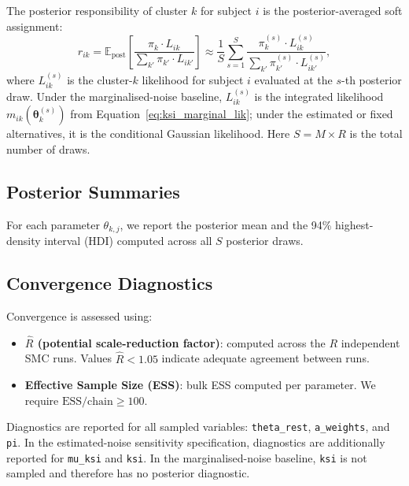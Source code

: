 \documentclass[12pt, a4paper]{article}
\newcommand{\E}{\mathbb{E}}
\newcommand{\btheta}{\bm{\theta}}
\begin{document}
The posterior responsibility of cluster $k$ for subject $i$ is the
posterior-averaged soft assignment:
\begin{equation}
  r_{ik} = \E_{\mathrm{post}}\!\left[
    \frac{\pi_k \cdot L_{ik}}{\sum_{k'} \pi_{k'} \cdot L_{ik'}}
  \right]
  \approx \frac{1}{S} \sum_{s=1}^{S}
    \frac{\pi_k^{(s)} \cdot L_{ik}^{(s)}}
         {\sum_{k'} \pi_{k'}^{(s)} \cdot L_{ik'}^{(s)}},
  \label{eq:responsibilities}
\end{equation}
where $L_{ik}^{(s)}$ is the cluster-$k$ likelihood for subject $i$ evaluated at
the $s$-th posterior draw.  Under the marginalised-noise baseline,
$L_{ik}^{(s)}$ is the integrated likelihood $m_{ik}(\btheta_k^{(s)})$ from
Equation~\eqref{eq:ksi_marginal_lik}; under the estimated or fixed alternatives,
it is the conditional Gaussian likelihood.  Here $S = M \times R$ is the total
number of draws.

\subsection{Posterior Summaries}

For each parameter $\theta_{k,j}$, we report the posterior mean and the 94\%
highest-density interval (HDI) computed across all $S$ posterior draws.

\subsection{Convergence Diagnostics}
\label{sec:convergence}

Convergence is assessed using:
\begin{itemize}
  \item \textbf{$\hat{R}$ (potential scale-reduction factor)}: computed across
    the $R$ independent SMC runs.  Values $\hat{R} < 1.05$ indicate adequate
    agreement between runs.
  \item \textbf{Effective Sample Size (ESS)}: bulk ESS computed per parameter.
    We require $\mathrm{ESS} / \text{chain} \geq 100$.
\end{itemize}
Diagnostics are reported for all sampled variables: \texttt{theta\_rest},
\texttt{a\_weights}, and \texttt{pi}.  In the estimated-noise sensitivity
specification, diagnostics are additionally reported for \texttt{mu\_ksi} and
\texttt{ksi}.  In the marginalised-noise baseline, \texttt{ksi} is not sampled
and therefore has no posterior diagnostic.

\end{document}
